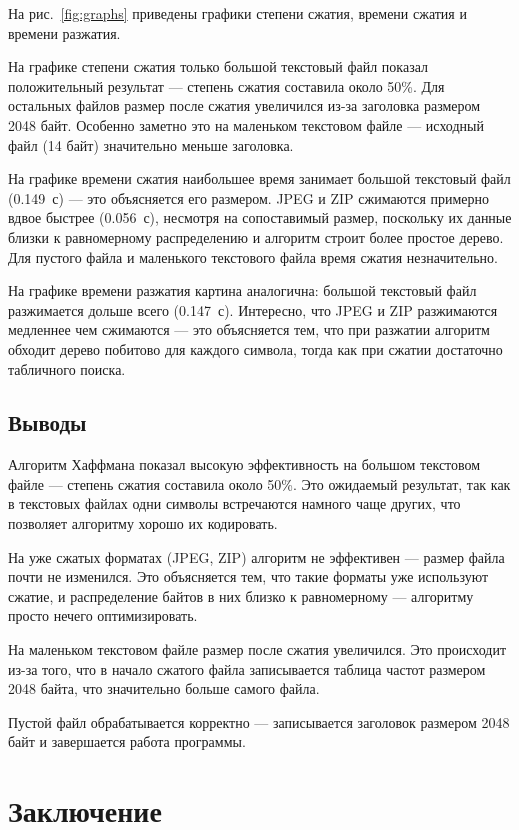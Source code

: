 \documentclass[a4paper]{article}
\begin{document}
На рис.~\ref{fig:graphs} приведены графики степени сжатия, времени сжатия и времени разжатия.

На графике степени сжатия только большой текстовый файл показал положительный результат --- степень сжатия составила около 50\%. Для остальных файлов размер после сжатия увеличился из-за заголовка размером 2048 байт. Особенно заметно это на маленьком текстовом файле --- исходный файл (14 байт) значительно меньше заголовка.

На графике времени сжатия наибольшее время занимает большой текстовый файл (0.149~с) --- это объясняется его размером. JPEG и ZIP сжимаются примерно вдвое быстрее (0.056~с), несмотря на сопоставимый размер, поскольку их данные близки к равномерному распределению и алгоритм строит более простое дерево. Для пустого файла и маленького текстового файла время сжатия незначительно.

На графике времени разжатия картина аналогична: большой текстовый файл разжимается дольше всего (0.147~с). Интересно, что JPEG и ZIP разжимаются медленнее чем сжимаются --- это объясняется тем, что при разжатии алгоритм обходит дерево побитово для каждого символа, тогда как при сжатии достаточно табличного поиска.


\subsection*{Выводы}

Алгоритм Хаффмана показал высокую эффективность на большом текстовом файле --- степень сжатия составила около 50\%. Это ожидаемый результат, так как в текстовых файлах одни символы встречаются намного чаще других, что позволяет алгоритму хорошо их кодировать.

На уже сжатых форматах (JPEG, ZIP) алгоритм не эффективен --- размер файла почти не изменился. Это объясняется тем, что такие форматы уже используют сжатие, и распределение байтов в них близко к равномерному --- алгоритму просто нечего оптимизировать.

На маленьком текстовом файле размер после сжатия увеличился. Это происходит из-за того, что в начало сжатого файла записывается таблица частот размером 2048 байта, что значительно больше самого файла.

Пустой файл обрабатывается корректно --- записывается заголовок размером 2048 байт и завершается работа программы.

\section{Заключение}
\end{document}

